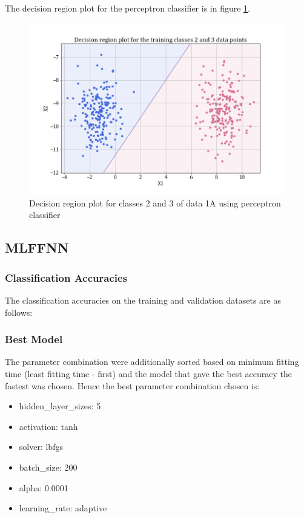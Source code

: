 \documentclass[11pt,a4paper]{article}
\begin{document}
The decision region plot for the perceptron classifier is in figure \ref{fig:perc_dec_reg_23}.
\begin{figure}[H]
    \centering
    \includegraphics[scale = 0.3]{images/training classes 2 and 3dec_reg_perceptron.png}
    \caption{Decision region plot for classes 2 and 3 of data 1A using perceptron classifier}
    \label{fig:perc_dec_reg_23}
\end{figure}


\subsection{MLFFNN}
\subsubsection{Classification Accuracies}
The classification accuracies on the training and validation datasets are as follows:


\subsubsection{Best Model}
The parameter combination were additionally sorted based on minimum fitting time (least fitting time - first) and the model that gave the best accuracy the fastest was chosen. Hence the best parameter combination chosen is:
\begin{itemize}
    \itemsep0em
    \item hidden\_layer\_sizes: 5
    \item activation: tanh
    \item solver: lbfgs
    \item batch\_size: 200
    \item alpha: 0.0001
    \item learning\_rate: adaptive
\end{itemize}
\end{document}
